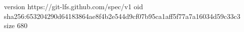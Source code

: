 version https://git-lfs.github.com/spec/v1
oid sha256:653204290d64183864ae8f4b2e544d9cf07b95ca1aff5f77a7a16034d59c33c3
size 680
